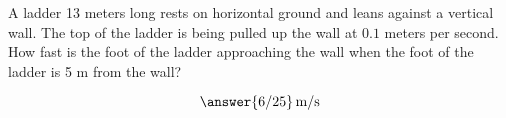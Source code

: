 \documentclass{ximera}
\author{Bart Snapp}
\begin{document}
\begin{exercise}

A ladder 13 meters long rests on horizontal ground and leans against a
vertical wall. The top of the ladder is being pulled up the wall at
$0.1$ meters per second.  How fast is the foot of the ladder
approaching the wall when the foot of the ladder is 5 m from the wall?
\begin{prompt}
  \[
  \answer{6/25}\,\text{m/s}
  \]
\end{prompt}
\end{exercise}
\end{document}
